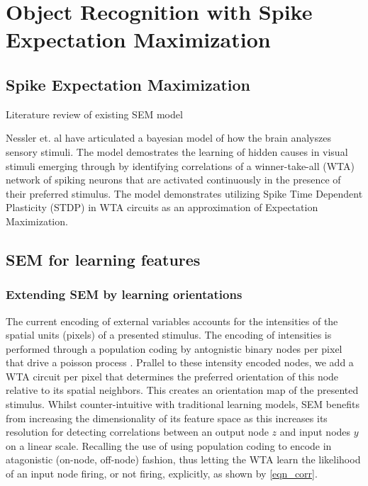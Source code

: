 \documentclass{report}%
\begin{document}

\chapter{Object Recognition with Spike Expectation Maximization}

\section{Spike Expectation Maximization}

Literature review of existing SEM model

Nessler et. al have articulated a bayesian model of how the brain analyszes sensory stimuli. The model demostrates the learning of hidden causes in visual stimuli emerging through by identifying correlations of a winner-take-all (WTA) network of spiking neurons that are activated continuously in the presence of their preferred stimulus. The model demonstrates utilizing Spike Time Dependent Plasticity (STDP) in WTA circuits as an approximation of Expectation Maximization. 

\section{SEM for learning features}

\subsection{Extending SEM by learning orientations}

The current encoding of external variables accounts for the intensities of the spatial units (pixels) of a presented stimulus. The encoding of intensities is performed through a population coding by antognistic binary nodes per pixel that drive a poisson process \cite{Nessler2010}. Prallel to these intensity encoded nodes, we add a WTA circuit per pixel that determines the preferred orientation of this node relative to its spatial neighbors. This creates an orientation map of the presented stimulus. Whilst counter-intuitive with traditional learning models, SEM benefits from increasing the dimensionality of its feature space as this increases its resolution for detecting correlations between an output node $z$ and input nodes $y$ on a linear scale. Recalling the use of using population coding to encode in atagonistic (on-node, off-node) fashion, thus letting the WTA learn the likelihood of an input node firing, or not firing, explicitly, as shown by \ref{eqn_corr}.
\end{document}

